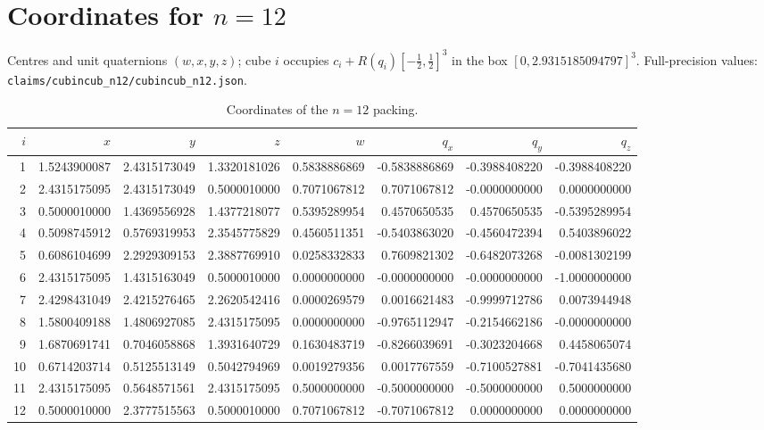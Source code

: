 \documentclass[11pt]{article}
\begin{document}
\section{Coordinates for $n=12$}
Centres and unit quaternions $(w,x,y,z)$; cube $i$ occupies $c_i+R(q_i)[-\tfrac12,\tfrac12]^3$ in the box $[0,2.9315185094797]^3$. Full-precision values: \texttt{claims/cubincub\_n12/cubincub\_n12.json}.
\begin{center}\scriptsize
\begin{longtable}{rrrrrrrr}\caption{Coordinates of the $n=12$ packing.}\label{tab:coords}\\\toprule
$i$ & $x$ & $y$ & $z$ & $w$ & $q_x$ & $q_y$ & $q_z$\\\midrule
1 & 1.5243900087 & 2.4315173049 & 1.3320181026 & 0.5838886869 & -0.5838886869 & -0.3988408220 & -0.3988408220 \\
2 & 2.4315175095 & 2.4315173049 & 0.5000010000 & 0.7071067812 & 0.7071067812 & -0.0000000000 & 0.0000000000 \\
3 & 0.5000010000 & 1.4369556928 & 1.4377218077 & 0.5395289954 & 0.4570650535 & 0.4570650535 & -0.5395289954 \\
4 & 0.5098745912 & 0.5769319953 & 2.3545775829 & 0.4560511351 & -0.5403863020 & -0.4560472394 & 0.5403896022 \\
5 & 0.6086104699 & 2.2929309153 & 2.3887769910 & 0.0258332833 & 0.7609821302 & -0.6482073268 & -0.0081302199 \\
6 & 2.4315175095 & 1.4315163049 & 0.5000010000 & 0.0000000000 & -0.0000000000 & -0.0000000000 & -1.0000000000 \\
7 & 2.4298431049 & 2.4215276465 & 2.2620542416 & 0.0000269579 & 0.0016621483 & -0.9999712786 & 0.0073944948 \\
8 & 1.5800409188 & 1.4806927085 & 2.4315175095 & 0.0000000000 & -0.9765112947 & -0.2154662186 & -0.0000000000 \\
9 & 1.6870691741 & 0.7046058868 & 1.3931640729 & 0.1630483719 & -0.8266039691 & -0.3023204668 & 0.4458065074 \\
10 & 0.6714203714 & 0.5125513149 & 0.5042794969 & 0.0019279356 & 0.0017767559 & -0.7100527881 & -0.7041435680 \\
11 & 2.4315175095 & 0.5648571561 & 2.4315175095 & 0.5000000000 & -0.5000000000 & -0.5000000000 & 0.5000000000 \\
12 & 0.5000010000 & 2.3777515563 & 0.5000010000 & 0.7071067812 & -0.7071067812 & 0.0000000000 & 0.0000000000 \\
\bottomrule
\end{longtable}
\end{center}
\end{document}
